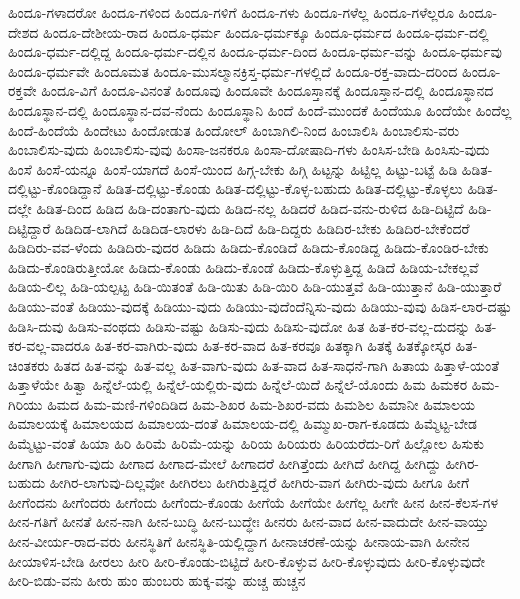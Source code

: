 {ಹಿಂದೂ-ಗಳಾದರೋ
ಹಿಂದೂ-ಗಳಿಂದ
ಹಿಂದೂ-ಗಳಿಗೆ
ಹಿಂದೂ-ಗಳು
ಹಿಂದೂ-ಗಳೆಲ್ಲ
ಹಿಂದೂ-ಗಳೆಲ್ಲರೂ
ಹಿಂದೂ-ದೇಶದ
ಹಿಂದೂ-ದೇಶೀಯ-ರಾದ
ಹಿಂದೂ-ಧರ್ಮ
ಹಿಂದೂ-ಧರ್ಮಕ್ಕೂ
ಹಿಂದೂ-ಧರ್ಮದ
ಹಿಂದೂ-ಧರ್ಮ-ದಲ್ಲಿ
ಹಿಂದೂ-ಧರ್ಮ-ದಲ್ಲಿದ್ದ
ಹಿಂದೂ-ಧರ್ಮ-ದಲ್ಲಿನ
ಹಿಂದೂ-ಧರ್ಮ-ದಿಂದ
ಹಿಂದೂ-ಧರ್ಮ-ವನ್ನು
ಹಿಂದೂ-ಧರ್ಮವು
ಹಿಂದೂ-ಧರ್ಮವೇ
ಹಿಂದೂಮತ
ಹಿಂದೂ-ಮುಸಲ್ಮಾನಕ್ರಿಸ್ತ-ಧರ್ಮ-ಗಳಲ್ಲಿದೆ
ಹಿಂದೂ-ರಕ್ತ-ವಾದು-ದರಿಂದ
ಹಿಂದೂ-ರಕ್ತವೇ
ಹಿಂದೂ-ವಿಗೆ
ಹಿಂದೂ-ವಿನಂತೆ
ಹಿಂದೂವು
ಹಿಂದೂವೇ
ಹಿಂದೂಸ್ತಾನಕ್ಕೆ
ಹಿಂದೂಸ್ತಾನ-ದಲ್ಲಿ
ಹಿಂದೂಸ್ಥಾನದ
ಹಿಂದೂಸ್ಥಾನ-ದಲ್ಲಿ
ಹಿಂದೂಸ್ಥಾನ-ದವ-ನೆಂದು
ಹಿಂದೂಸ್ಥಾನಿ
ಹಿಂದೆ
ಹಿಂದೆ-ಮುಂದಕೆ
ಹಿಂದೆಯೂ
ಹಿಂದೆಯೇ
ಹಿಂದೆಲ್ಲ
ಹಿಂದೆ-ಹಿಂದೆಯೆ
ಹಿಂದೇಟು
ಹಿಂದೋಡುತ
ಹಿಂದೋಲ್
ಹಿಂಬಾಗಿಲಿ-ನಿಂದ
ಹಿಂಬಾಲಿಸಿ
ಹಿಂಬಾಲಿಸು-ವರು
ಹಿಂಬಾಲಿಸು-ವುದು
ಹಿಂಬಾಲಿಸು-ವುವು
ಹಿಂಸಾ-ಜನಕರೂ
ಹಿಂಸಾ-ದೋಷಾದಿ-ಗಳು
ಹಿಂಸಿಸ-ಬೇಡಿ
ಹಿಂಸಿಸು-ವುದು
ಹಿಂಸೆ
ಹಿಂಸೆ-ಯನ್ನೂ
ಹಿಂಸೆ-ಯಾಗದೆ
ಹಿಂಸೆ-ಯಿಂದ
ಹಿಗ್ಗ-ಬೇಕು
ಹಿಗ್ಗಿ
ಹಿಟ್ಟನ್ನು
ಹಿಟ್ಟಿಲ್ಲ
ಹಿಟ್ಟು-ಬಟ್ಟೆ
ಹಿಡಿ
ಹಿಡಿತ-ದಲ್ಲಿಟ್ಟು-ಕೊಂಡಿದ್ದಾನೆ
ಹಿಡಿತ-ದಲ್ಲಿಟ್ಟು-ಕೊಂಡು
ಹಿಡಿತ-ದಲ್ಲಿಟ್ಟು-ಕೊಳ್ಳ-ಬಹುದು
ಹಿಡಿತ-ದಲ್ಲಿಟ್ಟು-ಕೊಳ್ಳಲು
ಹಿಡಿತ-ದಲ್ಲೇ
ಹಿಡಿತ-ದಿಂದ
ಹಿಡಿದ
ಹಿಡಿ-ದಂತಾಗು-ವುದು
ಹಿಡಿದ-ನಲ್ಲ
ಹಿಡಿದರೆ
ಹಿಡಿದ-ವನು-ರುಳಿದ
ಹಿಡಿ-ದಿಟ್ಟಿದೆ
ಹಿಡಿ-ದಿಟ್ಟಿದ್ದಾರೆ
ಹಿಡಿದಿಡ-ಲಾಗಿದೆ
ಹಿಡಿದಿಡ-ಲಾರಳು
ಹಿಡಿ-ದಿದೆ
ಹಿಡಿ-ದಿದ್ದರು
ಹಿಡಿದಿರ-ಬೇಕು
ಹಿಡಿದಿರ-ಬೇಕೆಂದರೆ
ಹಿಡಿದಿರು-ವವ-ಳೆಂದು
ಹಿಡಿದಿರು-ವುದರ
ಹಿಡಿದು
ಹಿಡಿದು-ಕೊಂಡಿದೆ
ಹಿಡಿದು-ಕೊಂಡಿದ್ದ
ಹಿಡಿದು-ಕೊಂಡಿರ-ಬೇಕು
ಹಿಡಿದು-ಕೊಂಡಿರುತ್ತೀಯೋ
ಹಿಡಿದು-ಕೊಂಡು
ಹಿಡಿದು-ಕೊಂಡೆ
ಹಿಡಿದು-ಕೊಳ್ಳುತ್ತಿದ್ದ
ಹಿಡಿದೆ
ಹಿಡಿಯ-ಬೇಕಲ್ಲವೆ
ಹಿಡಿಯ-ಲಿಲ್ಲ
ಹಿಡಿ-ಯಲ್ಪಟ್ಟ
ಹಿಡಿ-ಯಿತಂತೆ
ಹಿಡಿ-ಯಿತು
ಹಿಡಿ-ಯಿರಿ
ಹಿಡಿ-ಯುತ್ತವೆ
ಹಿಡಿ-ಯುತ್ತಾನೆ
ಹಿಡಿ-ಯುತ್ತಾರೆ
ಹಿಡಿಯು-ವಂತೆ
ಹಿಡಿಯು-ವುದಕ್ಕೆ
ಹಿಡಿಯು-ವುದು
ಹಿಡಿಯು-ವುದೆಂದೆನ್ನಿಸು-ವುದು
ಹಿಡಿಯು-ವುವು
ಹಿಡಿಸ-ಲಾರ-ದಷ್ಟು
ಹಿಡಿಸಿ-ದುವು
ಹಿಡಿಸು-ವಂಥದು
ಹಿಡಿಸು-ವಷ್ಟು
ಹಿಡಿಸು-ವುದು
ಹಿಡಿಸು-ವುದೋ
ಹಿತ
ಹಿತ-ಕರ-ವಲ್ಲ-ದುದನ್ನು
ಹಿತ-ಕರ-ವಲ್ಲ-ವಾದರೂ
ಹಿತ-ಕರ-ವಾಗಿರು-ವುದು
ಹಿತ-ಕರ-ವಾದ
ಹಿತ-ಕರವೂ
ಹಿತಕ್ಕಾಗಿ
ಹಿತಕ್ಕೆ
ಹಿತಕ್ಕೋಸ್ಕರ
ಹಿತ-ಚಿಂತಕರು
ಹಿತದ
ಹಿತ-ವನ್ನು
ಹಿತ-ವಲ್ಲ
ಹಿತ-ವಾಗು-ವುದು
ಹಿತ-ವಾದ
ಹಿತ-ಸಾಧನೆ-ಗಾಗಿ
ಹಿತಾಯ
ಹಿತ್ತಾಳೆ-ಯಂತೆ
ಹಿತ್ತಾಳೆಯೇ
ಹಿತ್ವಾ
ಹಿನ್ನೆಲೆ-ಯಲ್ಲಿ
ಹಿನ್ನೆಲೆ-ಯಲ್ಲಿರು-ವುದು
ಹಿನ್ನೆಲೆ-ಯಿದೆ
ಹಿನ್ನೆಲೆ-ಯೊಂದು
ಹಿಮ
ಹಿಮಕರ
ಹಿಮ-ಗಿರಿಯು
ಹಿಮದ
ಹಿಮ-ಮಣಿ-ಗಳಿಂದಿಡಿದ
ಹಿಮ-ಶಿಖರ
ಹಿಮ-ಶಿಖರ-ವದು
ಹಿಮಶಿಲ
ಹಿಮಾನೀ
ಹಿಮಾಲಯ
ಹಿಮಾಲಯಕ್ಕೆ
ಹಿಮಾಲಯದ
ಹಿಮಾಲಯ-ದಂತೆ
ಹಿಮಾಲಯ-ದಲ್ಲಿ
ಹಿಮ್ಮುಖ-ರಾಗ-ಕೂಡದು
ಹಿಮ್ಮೆಟ್ಟ-ಬೇಡ
ಹಿಮ್ಮೆಟ್ಟು-ವಂತೆ
ಹಿಯಾ
ಹಿರಿ
ಹಿರಿಮೆ
ಹಿರಿಮೆ-ಯನ್ನು
ಹಿರಿಯ
ಹಿರಿಯರು
ಹಿರಿಯರೆದು-ರಿಗೆ
ಹಿಲ್ಲೋಲ
ಹಿಸುಕು
ಹೀಗಾಗಿ
ಹೀಗಾಗು-ವುದು
ಹೀಗಾದ
ಹೀಗಾದ-ಮೇಲೆ
ಹೀಗಾದರೆ
ಹೀಗಿತ್ತೆಂದು
ಹೀಗಿದೆ
ಹೀಗಿದ್ದ
ಹೀಗಿದ್ದು
ಹೀಗಿರ-ಬಹುದು
ಹೀಗಿರ-ಲಾಗುವು-ದಿಲ್ಲವೋ
ಹೀಗಿರಲು
ಹೀಗಿರುತ್ತಿದ್ದರೆ
ಹೀಗಿರು-ವಾಗ
ಹೀಗಿರು-ವುದು
ಹೀಗೂ
ಹೀಗೆ
ಹೀಗೆಂದನು
ಹೀಗೆಂದರು
ಹೀಗೆಂದು
ಹೀಗೆಂದು-ಕೊಂಡು
ಹೀಗೆಯೆ
ಹೀಗೆಯೇ
ಹೀಗೆಲ್ಲ
ಹೀಗೇ
ಹೀನ
ಹೀನ-ಕೆಲಸ-ಗಳ
ಹೀನ-ಗತಿಗೆ
ಹೀನತೆ
ಹೀನ-ನಾಗಿ
ಹೀನ-ಬುದ್ಧಿ
ಹೀನ-ಬುದ್ಧೇಃ
ಹೀನರು
ಹೀನ-ವಾದ
ಹೀನ-ವಾದುದೇ
ಹೀನ-ವಾಯ್ತು
ಹೀನ-ವೀರ್ಯ-ರಾದ-ವರು
ಹೀನಸ್ಥಿತಿಗೆ
ಹೀನಸ್ಥಿತಿ-ಯಲ್ಲಿದ್ದಾಗ
ಹೀನಾಚರಣೆ-ಯನ್ನು
ಹೀನಾಯ-ವಾಗಿ
ಹೀನೇನ
ಹೀಯಾಳಿಸ-ಬೇಡಿ
ಹೀರಲು
ಹೀರಿ
ಹೀರಿ-ಕೊಂಡು-ಬಿಟ್ಟಿದೆ
ಹೀರಿ-ಕೊಳ್ಳುವ
ಹೀರಿ-ಕೊಳ್ಳುವುದು
ಹೀರಿ-ಕೊಳ್ಳುವುದೇ
ಹೀರಿ-ಬಿಡು-ವನು
ಹೀರು
ಹುಂ
ಹುಂಬರು
ಹುಕ್ಕ-ವನ್ನು
ಹುಚ್ಚ
ಹುಚ್ಚನ
}
